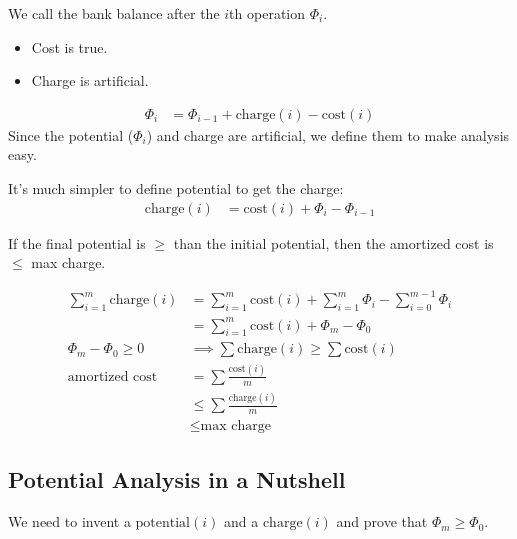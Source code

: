                 We call the bank balance after the $i$th operation $\Phi_i$.

                \begin{itemize}
                    \item Cost is true.
                    \item Charge is artificial.
                \end{itemize}

                \begin{align*}
                    \Phi_i &= \Phi_{i-1} + \text{charge}(i) - \text{cost}(i)
                \end{align*}
                Since the potential ($\Phi_i$) and charge are artificial, we define them to make analysis easy.

                It's much simpler to define potential to get the charge:
                \begin{align*}
                    \text{charge}(i) &= \text{cost}(i) + \Phi_i - \Phi_{i-1}
                \end{align*}

                If the final potential is $\ge$ than the initial potential, then the amortized cost is $\le$ max charge.

                \begin{align*}
                    \sum_{i=1}^m \text{charge}(i) &= \sum_{i=1}^m \text{cost}(i) + \sum_{i=1}^m \Phi_i - \sum_{i=0}^{m-1} \Phi_i \\
                    &= \sum_{i=1}^m \text{cost}(i) + \Phi_m - \Phi_0 \\
                    \Phi_m - \Phi_0 \ge0 &\implies \sum \text{charge}(i) \ge \sum \text{cost}(i) \\
                    \text{amortized cost} &= \sum \frac{\text{cost}(i)}{m} \\
                    &\le \sum \frac{\text{charge}(i)}{m} \\
                    &\le \text{max charge}
                \end{align*}

                \subsection{Potential Analysis in a Nutshell} %
                \label{sub:potential_analysis_in_a_nutshell}
                    We need to invent a $\text{potential}(i)$ and a $\text{charge}(i)$ and prove that $\Phi_m \ge \Phi_0$.

